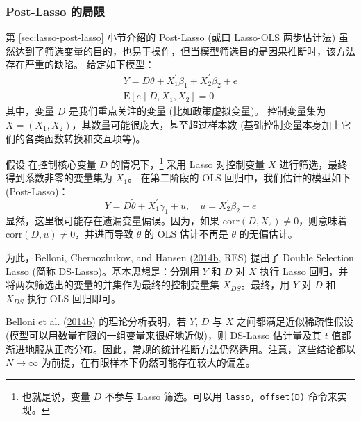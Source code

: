 \subsubsection{Post-Lasso 的局限}
第 \ref{sec:lasso-post-lasso} 小节介绍的 Post-Lasso (或曰 Lasso-OLS 两步估计法) 虽然达到了筛选变量的目的，也易于操作，但当模型筛选目的是因果推断时，该方法存在严重的缺陷。
给定如下模型：
\begin{equation}\label{eq:lasso-DS-01}
\begin{aligned}%
Y =D \theta + X_1^{\prime} \beta_1 + X_2^{\prime} \beta_2 + e \\
\mathrm{E}[e \mid D, X_1, X_2] =0
\end{aligned}
\end{equation}
其中，变量 $D$ 是我们重点关注的变量 (比如政策虚拟变量)。
控制变量集为 $X = (X_1, X_2)$，其数量可能很庞大，甚至超过样本数 (基础控制变量本身加上它们的各类函数转换和交互项等)。

假设%
在控制核心变量 $D$ 的情况下，\footnote{%
   也就是说，变量 $D$ 不参与 Lasso 筛选。可以用 \texttt{lasso, offset(D)} 命令来实现。}
采用 Lasso 对控制变量 $X$ 进行筛选，最终得到系数非零的变量集为 $X_1$。
在第二阶段的 OLS 回归中，我们估计的模型如下 (Post-Lasso)：
\begin{equation}\label{eq:lasso-DS-02}
Y =D \widetilde{\theta} + X_1^{\prime} \gamma_1 + u, \quad u= X_2^{\prime} \beta_2 + e
\end{equation}
显然，这里很可能存在遗漏变量偏误。因为，如果 $\mathrm{corr}(D,X_2) \neq 0$，则意味着 $\mathrm{corr}(D,u)\neq 0$，并进而导致 ${\widetilde{\theta}}$ 的 OLS 估计不再是 $\theta$ 的无偏估计。 

为此，Belloni, Chernozhukov, and Hansen (\href{http://sci-hub.ren/10.1093/restud/rdt044}{2014b}, RES) 提出了 Double Selection Lasso (简称 DS-Lasso)。基本思想是：分别用 $Y$ 和 $D$ 对 $X$ 执行 Lasso 回归，并将两次筛选出的变量的并集作为最终的控制变量集 $X_{DS}$。最终，用 $Y$ 对 $D$ 和 $X_{DS}$ 执行 OLS 回归即可。

Belloni et al. (\href{http://sci-hub.ren/10.1093/restud/rdt044}{2014b}) 的理论分析表明，若 $Y$, $D$ 与 $X$ 之间都满足近似稀疏性假设 (模型可以用数量有限的一组变量来很好地近似)，则 DS-Lasso 估计量及其 $t$ 值都渐进地服从正态分布。因此，常规的统计推断方法仍然适用。注意，这些结论都以 $N \to \infty$ 为前提，在有限样本下仍然可能存在较大的偏差。%

